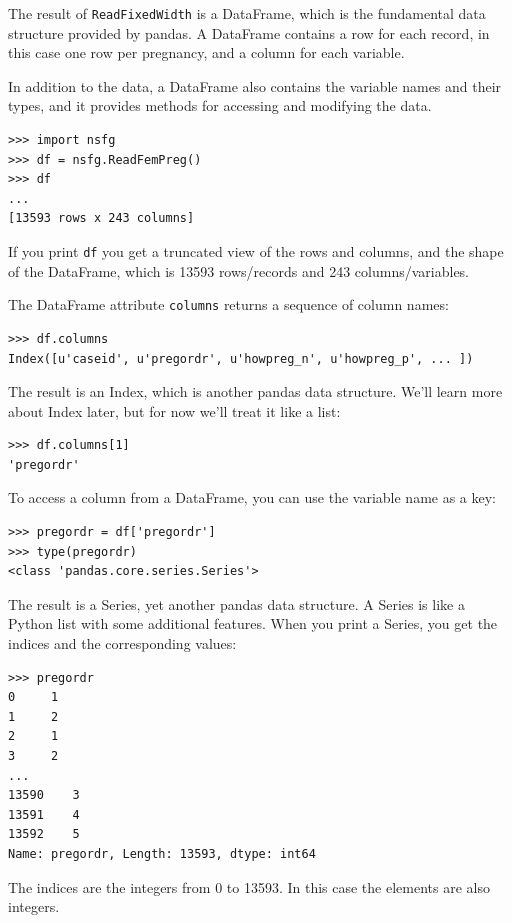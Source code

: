 \documentclass[12pt]{book}
\begin{document}
The result of {\tt ReadFixedWidth} is a DataFrame, which is the
fundamental data structure provided by pandas.  A DataFrame contains a
row for each record, in this case one row per pregnancy, and a column
for each variable.

In addition to the data, a DataFrame also contains the variable
names and their types, and it provides methods for accessing and modifying
the data.

\begin{verbatim}
>>> import nsfg
>>> df = nsfg.ReadFemPreg()
>>> df
...
[13593 rows x 243 columns]
\end{verbatim}

If you print {\tt df} you get a truncated view of the rows and
columns, and the shape of the DataFrame, which is 13593
rows/records and 243 columns/variables.

The DataFrame attribute {\tt columns} returns a sequence of column
names:

\begin{verbatim}
>>> df.columns
Index([u'caseid', u'pregordr', u'howpreg_n', u'howpreg_p', ... ])
\end{verbatim}

The result is an Index, which is another pandas data structure.  
We'll learn more about Index later, but for
now we'll treat it like a list:

\begin{verbatim}
>>> df.columns[1]
'pregordr'
\end{verbatim}

To access a column from a DataFrame, you can use the variable
name as a key:

\begin{verbatim}
>>> pregordr = df['pregordr']
>>> type(pregordr)
<class 'pandas.core.series.Series'>
\end{verbatim}

The result is a Series, yet another pandas data structure.
A Series is like a Python list with some additional features.
When you print a Series, you get the indices and the
corresponding values:

\begin{verbatim}
>>> pregordr
0     1
1     2
2     1
3     2
...
13590    3
13591    4
13592    5
Name: pregordr, Length: 13593, dtype: int64
\end{verbatim}

The indices are the integers from 0 to 13593.  In this case
the elements are also integers.
\end{document}
